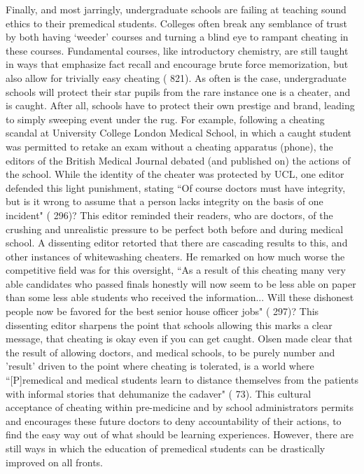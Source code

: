 \documentclass [12pt]{article}
\begin{document}
\begin{flushleft}
Finally, and most jarringly, undergraduate schools are failing at teaching sound ethics to their premedical students. Colleges often break any semblance of trust by both having {`}weeder' courses and turning a blind eye to rampant cheating in these courses. Fundamental courses, like introductory chemistry, are still taught in ways that emphasize fact recall and encourage brute force memorization, but also allow for trivially easy cheating (\cite{Cooper-2013} 821). As often is the case, undergraduate schools will protect their star pupils from the rare instance one is a cheater, and is caught. After all, schools have to protect their own prestige and brand, leading to simply sweeping event under the rug. For example, following a cheating scandal at University College London Medical School, in which a caught student was permitted to retake an exam without a cheating apparatus (phone), the editors of the British Medical Journal debated (and published on) the actions of the school. While the identity of the cheater was protected by UCL, one editor defended this light punishment, stating {``}Of course doctors must have integrity, but is it wrong to assume that a person lacks integrity on the basis of one incident" (\cite{Spencer-2001} 296)? This editor reminded their readers, who are doctors, of the crushing and unrealistic pressure to be perfect both before and during medical school. A dissenting editor retorted that there are cascading results to this, and other instances of whitewashing cheaters. He remarked on how much worse the competitive field was for this oversight, {``}As a result of this cheating many very able candidates who passed finals honestly will now seem to be less able on paper than some less able students who received the information... Will these dishonest people now be favored for the best senior house officer jobs" (\cite{Spencer-2001} 297)? This dissenting editor sharpens the point that schools allowing this marks a clear message, that cheating is okay even if you can get caught. Olsen made clear that the result of allowing doctors, and medical schools, to be purely number and 'result' driven to the point where cheating is tolerated, is a world where {``}[P]remedical and medical students learn to distance themselves from the patients with informal stories that dehumanize the cadaver" (\cite{Olsen-2016} 73). This cultural acceptance of cheating within pre-medicine and by school administrators permits and encourages these future doctors to deny accountability of their actions, to find the easy way out of what should be learning experiences. However, there are still ways in which the education of premedical students can be drastically improved on all fronts.
	

\end{flushleft}
\end{document}
